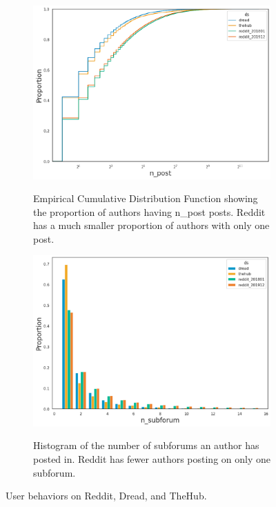 \begin{figure}
    \begin{subfigure}{0.75\linewidth}
        \centering
        \includegraphics[width=\textwidth,alt={Empirical Cumulative Distribution Function showing the proportion of authors having n\_post posts.}]{stylometryExtensions/figures/RedditPostCDF}
        \caption{Empirical Cumulative Distribution Function showing the proportion of authors having n\_post posts. Reddit has a much smaller proportion of authors with only one post.}
        \label{fig:stylometry_extensions:followingTrail:datasets:behaviors:posts}
    \end{subfigure}
    \begin{subfigure}{0.75\linewidth}
        \centering
        \includegraphics[width=\textwidth,alt={Histogram of the number of subforums an author has posted in.}]{stylometryExtensions/figures/RedditSubforumCounts}
        \caption{Histogram of the number of subforums an author has posted in. Reddit has fewer authors posting on only one subforum.}
        \label{fig:stylometry_extensions:followingTrail:datasets:behaviors:subforums}
    \end{subfigure}
    \caption{User behaviors on Reddit, Dread, and TheHub.}
    \label{fig:stylometry_extensions:followingTrail:datasets:behaviors}
\end{figure}

